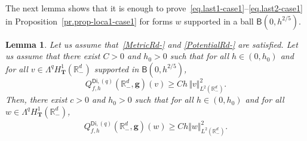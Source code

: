 \documentclass[10pt]{amsart}
\newcommand{\mbf}[1]{\mathbf{#1}}
\theoremstyle{plain}
\newtheorem{lemma}[proposition]{Lemma}
\theoremstyle{definition}
\begin{document}
The next lemma shows that it is enough to
prove~\eqref{eq.last1-case1}--\eqref{eq.last2-case1} in
Proposition~\ref{pr.prop-loca1-case1} for forms $w$ supported in a
ball $\mathsf B(0,h^{2/5})$.
\begin{lemma}\label{le.IMS-loca}
Let us assume that~\ref{MetricRd-} and \ref{PotentialRd-} are
satisfied. Let us assume that there exist $C>0$ and $h_0>0$ such
that for all $h\in (0,h_0)$ and for all $v\in \Lambda^q H^1_{\mbf T}(\mathbb R^d_-)$ supported in $\mathsf B(0,h^{2/5})$,
\begin{equation}\label{eq.cond1Q}
Q_{f,h}^{\mathsf{Di},(q)}(\mathbb R^d_-,\mbf g)(v)\ge Ch\, \Vert v \Vert_{L^2(\mathbb R^d_-)}^2.
\end{equation}
Then, there exist $c>0$ and $h_0>0$ such that for all $h\in
(0,h_0)$ and for all $w\in \Lambda^q H^1_{\mbf T}(\mathbb R^d_-)$,
\begin{align*}
Q_{f,h}^{\mathsf{Di},(q)}(\mathbb R^d_-,\mbf g)(w)\ge Ch \Vert w \Vert_{L^2(\mathbb R_-^d)}^2.
\end{align*}
\end{lemma}
\end{document}
